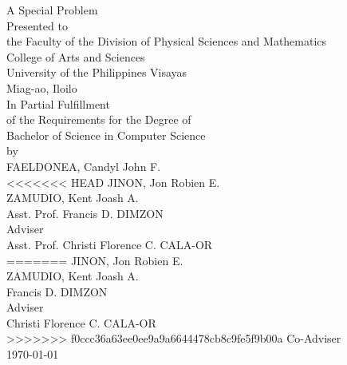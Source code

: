 \begin{titlepage}
\centering


\vspace{0.875cm}
A Special Problem\\
Presented to\\
the Faculty of the Division of Physical Sciences and Mathematics\\
College of Arts and Sciences\\
University of the Philippines Visayas\\
Miag-ao, Iloilo\\
\vspace{0.875cm}
In Partial Fulfillment\\
of the Requirements for the Degree of\\
Bachelor of Science in Computer Science\\
\vspace{1.1cm} %
by\\
\vspace{0.1cm}
FAELDONEA, Candyl John F. \\
<<<<<<< HEAD
JINON, Jon Robien  E.\\
ZAMUDIO, Kent Joash  A.\\
\vspace{0.875cm}
Asst. Prof. Francis D. DIMZON \\
Adviser\\
Asst. Prof. Christi Florence C. CALA-OR \\
=======
JINON, Jon Robien E. \\
ZAMUDIO, Kent Joash A. \\
\vspace{0.875cm}
Francis D. DIMZON \\
Adviser\\
Christi Florence C. CALA-OR \\
>>>>>>> f0ccc36a63ee0ee9a9a6644478cb8c9fe5f9b00a
Co-Adviser\\
\vspace{0.875cm}
\today
\end{titlepage}
